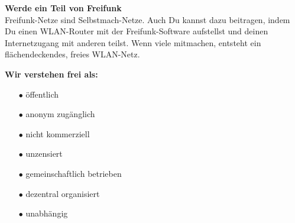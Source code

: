 \documentclass[a4paper]{article}
\begin{document}
\newpage
\thispagestyle{empty}

\begin{Row}
  \begin{Cell}{5}
    \textbf{Werde ein Teil von Freifunk} \\
Freifunk-Netze sind Selbstmach-Netze. Auch Du kannst dazu beitragen, indem Du einen WLAN-Router mit der Freifunk-Software aufstellst und deinen Internetzugang mit anderen teilst. Wenn viele mitmachen, entsteht ein flächendeckendes, freies WLAN-Netz.
  \end{Cell}
  \begin{Cell}{4}
    \textbf{Wir verstehen frei als:} \vspace*{-0.35cm}

		\begin{itemize}
			\setlength{\itemindent}{0.5em}
		  \item[\textcolor{freifunkpink}{\Large$\bullet$}] öffentlich \vspace*{-0.3cm}
		  \item[\textcolor{freifunkpink}{\Large$\bullet$}] anonym zugänglich \vspace*{-0.3cm}
		  \item[\textcolor{freifunkpink}{\Large$\bullet$}] nicht kommerziell \vspace*{-0.3cm}
		  \item[\textcolor{freifunkpink}{\Large$\bullet$}] unzensiert \vspace*{-0.3cm}
		  \item[\textcolor{freifunkpink}{\Large$\bullet$}] gemeinschaftlich betrieben\vspace*{-0.3cm}
			\item[\textcolor{freifunkpink}{\Large$\bullet$}] dezentral organisiert\vspace*{-0.3cm}
		  \item[\textcolor{freifunkpink}{\Large$\bullet$}] unabhängig
		\end{itemize}
  \end{Cell}
\end{Row}

\vspace{1.5em}
\end{document}
